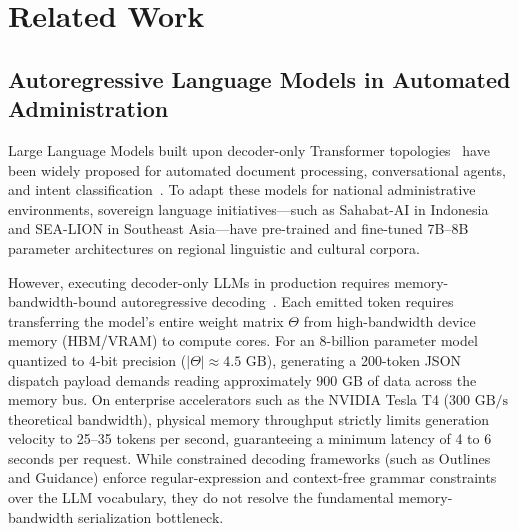 \documentclass[journal,compsoc]{IEEEtran}
\begin{document}
\section{Related Work}

\subsection{Autoregressive Language Models in Automated Administration}
Large Language Models built upon decoder-only Transformer topologies~\cite{vaswani2017attention} have been widely proposed for automated document processing, conversational agents, and intent classification~\cite{achiam2023gpt4,touvron2023llama}. To adapt these models for national administrative environments, sovereign language initiatives—such as Sahabat-AI in Indonesia~\cite{sahabatai2024} and SEA-LION in Southeast Asia—have pre-trained and fine-tuned 7B--8B parameter architectures on regional linguistic and cultural corpora.

However, executing decoder-only LLMs in production requires memory-bandwidth-bound autoregressive decoding~\cite{aminabadi2022deepspeed}. Each emitted token requires transferring the model's entire weight matrix $\Theta$ from high-bandwidth device memory (HBM/VRAM) to compute cores. For an 8-billion parameter model quantized to 4-bit precision ($|\Theta| \approx 4.5 \text{ GB}$), generating a 200-token JSON dispatch payload demands reading approximately $900 \text{ GB}$ of data across the memory bus. On enterprise accelerators such as the NVIDIA Tesla T4 ($300 \text{ GB/s}$ theoretical bandwidth), physical memory throughput strictly limits generation velocity to 25--35 tokens per second, guaranteeing a minimum latency of 4 to 6 seconds per request. While constrained decoding frameworks (such as Outlines~\cite{willard2023outlines} and Guidance) enforce regular-expression and context-free grammar constraints over the LLM vocabulary, they do not resolve the fundamental memory-bandwidth serialization bottleneck.
\end{document}
